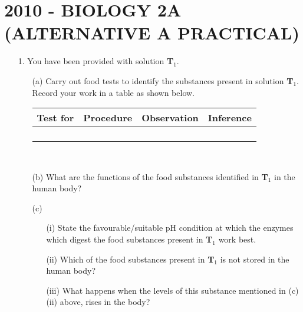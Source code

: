 \section{2010 - BIOLOGY 2A (ALTERNATIVE A PRACTICAL)}

\begin{enumerate}
\item[1.] You have been provided with solution \textbf{T$_1$}.
\begin{enumerate}
\item[(a)] Carry out food tests to identify the substances present in solution \textbf{T$_1$}. Record your work in a table as shown below.

\begin{center}
\begin{tabular}{|p{3cm}|p{3cm}|p{3cm}|p{3cm}|} \hline
\multicolumn{1}{|c|}{\textbf{Test for}}&\multicolumn{1}{c|}{\textbf{Procedure}}&\multicolumn{1}{c|}{\textbf{Observation}}&\multicolumn{1}{c|}{\textbf{Inference}} \\ \hline
&&& \\
&&& \\
&&& \\
&&& \\ \hline
\end{tabular} \\[10pt]
\end{center}

\item[(b)] What are the functions of the food substances identified in \textbf{T$_1$} in the human body?
\item[(c)] 
\begin{enumerate}
\item[(i)] State the favourable/suitable pH condition at which the enzymes which digest the food substances present in \textbf{T$_1$} work best.
\item[(ii)] Which of the food substances present in \textbf{T$_1$} is not stored in the human body?
\item[(iii)] What happens when the levels of this substance mentioned in (c) (ii) above, rises in the body?
\end{enumerate}
\end{enumerate}


\end{enumerate}
